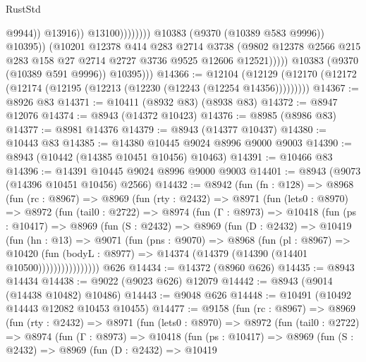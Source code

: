 \begin{lexlean}{RustStd}
\begin{coremodule}
                                            @9944))
                                        @13916))
                                    @13100))))))))
                    @10383
                    (@9370 (@10389 @583 @9996))
                    @10395))
                (@10201
                  @12378
                  @414
                  @283
                  @2714
                  @3738
                  (@9802 @12378 @2566 @215 @283 @158 @27 @2714 @2727 @3736 @9525 @12606 @12521)))))
          @10383
          (@9370 (@10389 @591 @9996))
          @10395)))
@14366 := @12104
    (@12129 (@12170 (@12172 (@12174 (@12195 (@12213 (@12230 (@12243 (@12254 @14356)))))))))
@14367 := @8926 @83
@14371 := @10411 (@8932 @83) (@8938 @83)
@14372 := @8947 @12076
@14374 := @8943 (@14372 @10423)
@14376 := @8985 (@8986 @83)
@14377 := @8981 @14376
@14379 := @8943 (@14377 @10437)
@14380 := @10443 @83
@14385 := @14380 @10445 @9024 @8996 @9000 @9003
@14390 := @8943 (@10442 (@14385 @10451 @10456) @10463)
@14391 := @10466 @83
@14396 := @14391 @10445 @9024 @8996 @9000 @9003
@14401 := @8943 (@9073 (@14396 @10451 @10456) @2566)
@14432 := @8942
    (fun (fn : @128) =>
    @8968
      (fun (rc : @8967) =>
      @8969
        (fun (rty : @2432) =>
        @8971
          (fun (lets0 : @8970) =>
          @8972
            (fun (tail0 : @2722) =>
            @8974
              (fun (Γ : @8973) =>
              @10418
                (fun (ps : @10417) =>
                @8969
                  (fun (S : @2432) =>
                  @8969
                    (fun (D : @2432) =>
                    @10419
                      (fun (hn : @13) =>
                      @9071
                        (fun (pns : @9070) =>
                        @8968
                          (fun (pl : @8967) =>
                          @10420
                            (fun (bodyL : @8977) =>
                            @14374 (@14379 (@14390 (@14401 @10500))))))))))))))))
    @626
@14434 := @14372 (@8960 @626)
@14435 := @8943 @14434
@14438 := @9022 (@9023 @626) @12079
@14442 := @8943 (@9014 (@14438 @10482) @10486)
@14443 := @9048 @626
@14448 := @10491 (@10492 @14443 @12082 @10453 @10455)
@14477 := @9158
    (fun (rc : @8967) =>
    @8969
      (fun (rty : @2432) =>
      @8971
        (fun (lets0 : @8970) =>
        @8972
          (fun (tail0 : @2722) =>
          @8974
            (fun (Γ : @8973) =>
            @10418
              (fun (ps : @10417) =>
              @8969
                (fun (S : @2432) =>
                @8969
                  (fun (D : @2432) =>
                  @10419

\end{coremodule}
\end{lexlean}
